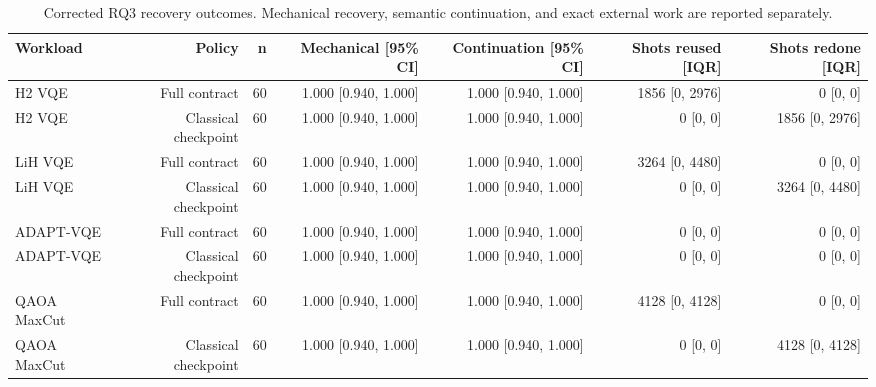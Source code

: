 \begin{table}[t]
\centering
\small
\begin{tabular}{lrrrrrr}
\toprule
Workload & Policy & n & Mechanical [95\% CI] & Continuation [95\% CI] & Shots reused [IQR] & Shots redone [IQR] \\
\midrule
H2 VQE & Full contract & 60 & 1.000 [0.940, 1.000] & 1.000 [0.940, 1.000] & 1856 [0, 2976] & 0 [0, 0] \\
H2 VQE & Classical checkpoint & 60 & 1.000 [0.940, 1.000] & 1.000 [0.940, 1.000] & 0 [0, 0] & 1856 [0, 2976] \\
LiH VQE & Full contract & 60 & 1.000 [0.940, 1.000] & 1.000 [0.940, 1.000] & 3264 [0, 4480] & 0 [0, 0] \\
LiH VQE & Classical checkpoint & 60 & 1.000 [0.940, 1.000] & 1.000 [0.940, 1.000] & 0 [0, 0] & 3264 [0, 4480] \\
ADAPT-VQE & Full contract & 60 & 1.000 [0.940, 1.000] & 1.000 [0.940, 1.000] & 0 [0, 0] & 0 [0, 0] \\
ADAPT-VQE & Classical checkpoint & 60 & 1.000 [0.940, 1.000] & 1.000 [0.940, 1.000] & 0 [0, 0] & 0 [0, 0] \\
QAOA MaxCut & Full contract & 60 & 1.000 [0.940, 1.000] & 1.000 [0.940, 1.000] & 4128 [0, 4128] & 0 [0, 0] \\
QAOA MaxCut & Classical checkpoint & 60 & 1.000 [0.940, 1.000] & 1.000 [0.940, 1.000] & 0 [0, 0] & 4128 [0, 4128] \\
\bottomrule
\end{tabular}
\caption{Corrected RQ3 recovery outcomes. Mechanical recovery, semantic continuation, and exact external work are reported separately.}
\label{tab:rq3_fair_classical}
\end{table}
